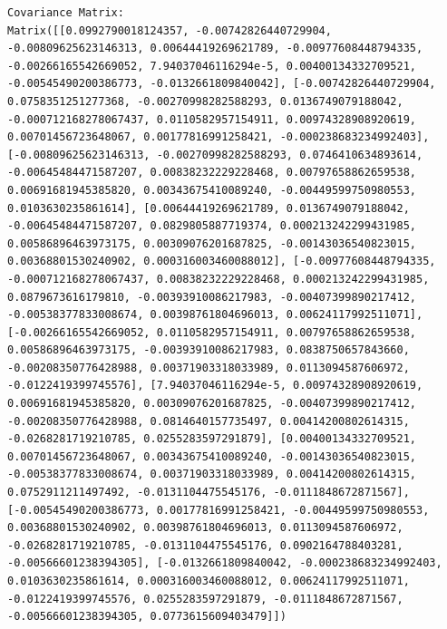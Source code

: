 \documentclass[
  letterpaper,
  DIV=11,
  numbers=noendperiod]{scrreprt}
\theoremstyle{plain}
\theoremstyle{definition}
\theoremstyle{remark}
\begin{document}
\begin{verbatim}
Covariance Matrix:
Matrix([[0.0992790018124357, -0.00742826440729904, -0.00809625623146313, 0.00644419269621789, -0.00977608448794335, -0.00266165542669052, 7.94037046116294e-5, 0.00400134332709521, -0.00545490200386773, -0.0132661809840042], [-0.00742826440729904, 0.0758351251277368, -0.00270998282588293, 0.0136749079188042, -0.000712168278067437, 0.0110582957154911, 0.00974328908920619, 0.00701456723648067, 0.00177816991258421, -0.000238683234992403], [-0.00809625623146313, -0.00270998282588293, 0.0746410634893614, -0.00645484471587207, 0.00838232229228468, 0.00797658862659538, 0.00691681945385820, 0.00343675410089240, -0.00449599750980553, 0.0103630235861614], [0.00644419269621789, 0.0136749079188042, -0.00645484471587207, 0.0829805887719374, 0.000213242299431985, 0.00586896463973175, 0.00309076201687825, -0.00143036540823015, 0.00368801530240902, 0.000316003460088012], [-0.00977608448794335, -0.000712168278067437, 0.00838232229228468, 0.000213242299431985, 0.0879673616179810, -0.00393910086217983, -0.00407399890217412, -0.00538377833008674, 0.00398761804696013, 0.00624117992511071], [-0.00266165542669052, 0.0110582957154911, 0.00797658862659538, 0.00586896463973175, -0.00393910086217983, 0.0838750657843660, -0.00208350776428988, 0.00371903318033989, 0.0113094587606972, -0.0122419399745576], [7.94037046116294e-5, 0.00974328908920619, 0.00691681945385820, 0.00309076201687825, -0.00407399890217412, -0.00208350776428988, 0.0814640157735497, 0.00414200802614315, -0.0268281719210785, 0.0255283597291879], [0.00400134332709521, 0.00701456723648067, 0.00343675410089240, -0.00143036540823015, -0.00538377833008674, 0.00371903318033989, 0.00414200802614315, 0.0752911211497492, -0.0131104475545176, -0.0111848672871567], [-0.00545490200386773, 0.00177816991258421, -0.00449599750980553, 0.00368801530240902, 0.00398761804696013, 0.0113094587606972, -0.0268281719210785, -0.0131104475545176, 0.0902164788403281, -0.00566601238394305], [-0.0132661809840042, -0.000238683234992403, 0.0103630235861614, 0.000316003460088012, 0.00624117992511071, -0.0122419399745576, 0.0255283597291879, -0.0111848672871567, -0.00566601238394305, 0.0773615609403479]])


\end{verbatim}
\end{document}
